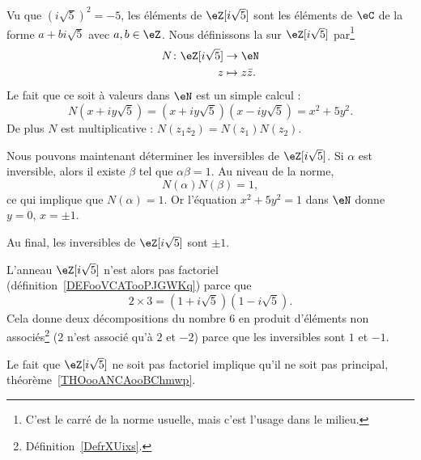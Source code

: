 \begin{example}     \label{EXooYCTDooGXAjGC}
    Vu que \( (i\sqrt{ 5 })^2=-5\), les éléments de \( \eZ[i\sqrt{ 5 }]\) sont les éléments de \( \eC\) de la forme \( a+bi\sqrt{ 5 }\) avec \( a,b\in \eZ\). Nous définissons la  sur \( \eZ[i\sqrt{ 5 }]\) par\footnote{C'est le carré de la norme usuelle, mais c'est l'usage dans le milieu.}
    \begin{equation}
        \begin{aligned}
            N\colon \eZ[i\sqrt{ 5 }]&\to \eN \\
            z&\mapsto z\bar z.
        \end{aligned}
    \end{equation}
    Le fait que ce soit à valeurs dans \( \eN\) est un simple calcul :
    \begin{equation}
        N(x+iy\sqrt{ 5 })=(x+iy\sqrt{ 5 })(x-iy\sqrt{ 5 })=x^2+5y^2.
    \end{equation}
    De plus \( N\) est multiplicative : \( N(z_1z_2)=N(z_1)N(z_2)\).

    Nous pouvons maintenant déterminer les inversibles de \( \eZ[i\sqrt{ 5 }]\). Si \( \alpha\) est inversible, alors il existe \( \beta\) tel que \( \alpha\beta=1\). Au niveau de la norme,
    \begin{equation}
        N(\alpha)N(\beta)=1,
    \end{equation}
    ce qui implique que \( N(\alpha)=1\). Or l'équation \( x^2+5y^2=1\) dans \( \eN\) donne \( y=0\), \( x=\pm 1\).

    Au final, les inversibles de \( \eZ[i\sqrt{ 5 }]\) sont \( \pm 1\).

    L'anneau \( \eZ[i\sqrt{ 5 }]\) n'est alors pas factoriel (définition~\ref{DEFooVCATooPJGWKq}) parce que
    \begin{equation}
        2\times 3=(1+i\sqrt{ 5 })(1-i\sqrt{ 5 }).
    \end{equation}
    Cela donne deux décompositions du nombre \( 6\) en produit d'éléments non associés\footnote{Définition~\ref{DefrXUixs}.} (\( 2\) n'est associé qu'à \( 2\) et \( -2\)) parce que les inversibles sont \( 1\) et \( -1\).

    Le fait que \( \eZ[i\sqrt{ 5 }]\) ne soit pas factoriel implique qu'il ne soit pas principal, théorème~\ref{THOooANCAooBChmwp}.
\end{example}

